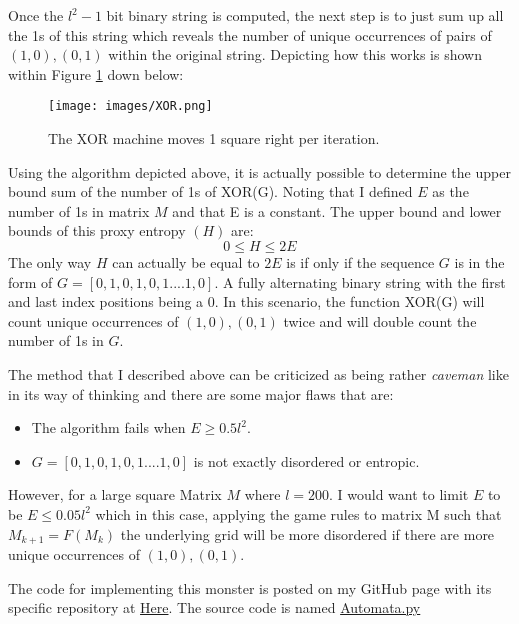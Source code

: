 Once the $l^2-1$ bit binary string is computed, the next step is to just sum up all the 1s of this string which reveals the number of unique occurrences of pairs of $(1,0), (0,1)$ within the original string. Depicting how this works is shown within Figure \ref{fig:XOR} down below: 
\begin{figure}[H]
    \centering
    \texttt{[image: images/XOR.png]}
    \caption{The XOR machine moves 1 square right per iteration.}
    \label{fig:XOR}
\end{figure}
Using the algorithm depicted above, it is actually possible to determine the upper bound sum of the number of 1s of XOR(G). Noting that I defined $E$ as the number of 1s in matrix $M$ and that E is a constant. The upper bound and lower bounds of this proxy entropy $(H)$ are: 
$$0 \le H \le 2E$$
The only way $H$ can actually be equal to $2E$ is if only if the sequence $G$ is in the form of $G=[0, 1, 0, 1, 0, 1 .... 1, 0]$. A fully alternating binary string with the first and last index positions being a 0. In this scenario, the function XOR(G) will count unique occurrences of $(1,0), (0,1)$ twice and will double count the number of 1s in $G$. \par

\vspace{0.3cm}
The method that I described above can be criticized as being rather \emph{caveman} like in its way of thinking and there are some major flaws that are: 
\begin{itemize}
    \item The algorithm fails when $E \ge 0.5 l^{2}$.
    \item $G=[0, 1, 0, 1, 0, 1 .... 1, 0]$ is not exactly disordered or entropic.
\end{itemize}
However, for a large square Matrix $M$ where $l=200$. I would want to limit $E$ to be $E \leq 0.05l^{2}$ which in this case, applying the game rules to matrix M such that $M_{k+1}=F(M_{k})$ the underlying grid will be more disordered if there are more unique occurrences of $(1,0), (0,1)$. \par

\vspace{0.3cm}
The code for implementing this monster is posted on my GitHub page with its specific repository at \href{https://github.com/ShiroHusin/Entropy_Simulation?fbclid=IwAR32gsNSPyy80Pt0_VytukZG9eIPFMg20cl77TeuiW-TH2A0giijnKegKTo}{Here}. The source code is named \href{https://github.com/ShiroHusin/Entropy_Simulation/blob/main/Automata.py}{Automata.py}
